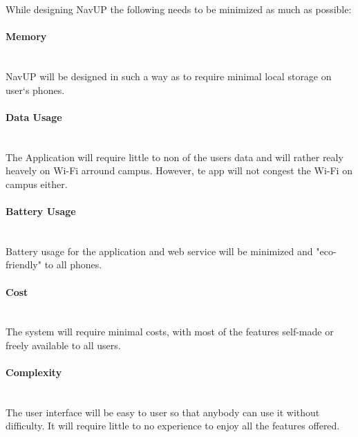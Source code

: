 While designing NavUP the following needs to be minimized as much as possible:


\paragraph{Memory}
\mbox{}\\
NavUP will be designed in such a way as to require minimal local storage on user`s phones.

\paragraph{Data Usage}
\mbox{}\\
The Application will require little to non of the users data and will rather realy heavely on Wi-Fi arround campus. However, te app will not congest the Wi-Fi on campus either.

\paragraph{Battery Usage}
\mbox{}\\
Battery usage for the application and web service will be minimized and "eco-friendly" to all phones.

\paragraph{Cost}
\mbox{}\\
The system will require minimal costs, with most of the features self-made or freely available to all users.

\paragraph{Complexity}
\mbox{}\\
The user interface will be easy to user so that anybody can use it without difficulty. 
It will require little to no experience to enjoy all the features offered.